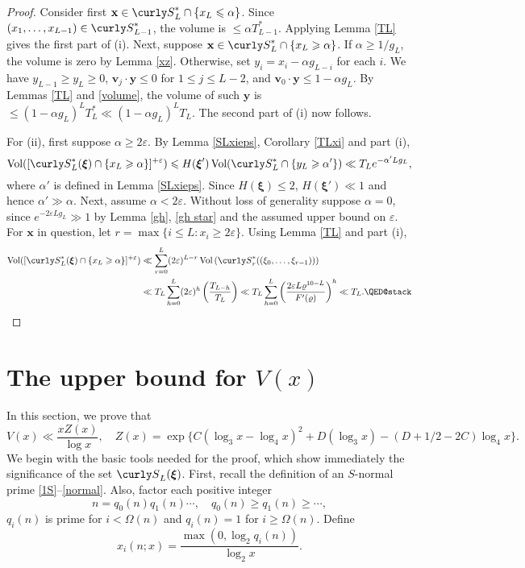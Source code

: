 \documentclass[11pt]{amsart}
\theoremstyle{remark}
\theoremstyle{plain}
\numberwithin{equation}{section}
\newcommand{\be}{\begin{equation}}
\newcommand{\ee}{\end{equation}}
\renewcommand{\a}{\ensuremath{\alpha}}
\newcommand{\eps}{\ensuremath{\varepsilon}}
\renewcommand{\(}{\left(}
\renewcommand{\)}{\right)}
\newcommand{\pfrac}[2]{\left(\frac{#1}{#2}\right)}
\newcommand{\fancyS}{{\curly S}}
\renewcommand{\le}{\leqslant}
\renewcommand{\ge}{\geqslant}
\renewcommand{\rho}{\varrho}
\newcommand{\om}{\Omega}
\newcommand{\bxi}{\boldsymbol\xi}
\newcommand{\vxi}{\bxi}
\newcommand{\vx}{\mathbf{x}}
\newcommand{\vy}{\mathbf{y}}
\DeclareMathOperator{\vvol}{Vol}
\newcommand{\vv}{\mathbf{v}}
\begin{document}
\begin{proof}
Consider first $\vx\in \fancyS_L^*\cap\{x_L\le\a\}$.  Since
 $(x_1, \ldots, x_{L-1}) \in \fancyS_{L-1}^*$, 
the volume  is $\le \a T_{L-1}^*$.
Applying Lemma \ref{TL} gives the first part of (i).
Next, suppose $\vx\in\fancyS_L^*\cap\{x_L\ge\a\}$.
If $\a\ge 1/g_L$, the volume is zero by Lemma \ref{xz}.  Otherwise, set
$y_i = x_i - \a g_{L-i}$ for each $i$.
We have $y_{L-1}\ge y_L\ge 0$, $\vv_j\cdot \vy \le 0$
for $1\le j\le L-2$, and $\vv_0 \cdot \vy \le 1 - \a g_L$.
By Lemmas \ref{TL} and \ref{volume}, the volume of such $\vy$ is
$\le (1-\a g_L)^L T_L^* \ll (1-\a g_L)^L T_L$. 
 The second part of (i) now follows.

For (ii), first suppose $\a \ge 2\eps$.  By Lemma \ref{SLxieps}, Corollary 
\ref{TLxi} and part (i),
\[
 \vvol([\fancyS_L^*(\bxi) \cap \{x_L\ge \a\}]^{+\eps}) \le H(\bxi') \vvol(\fancyS_L^*
\cap \{y_L \ge \a'\}) \ll T_L e^{-\a'Lg_L},
\]
where $\a'$ is defined  in Lemma \ref{SLxieps}.
Since $H(\bxi)\le 2$, $H(\bxi')\ll 1$ and hence $\a' \gg \a$.  Next, assume $\a < 2\eps$.
Without loss of generality suppose $\a=0$, since $e^{-2\eps Lg_L} \gg 1$ by Lemma
\ref{gh}, \eqref{gh star} and the assumed upper bound on $\eps$.  For $\vx$ in question, let
$r=\max\{i\le L: x_i \ge 2\eps\}$.  Using Lemma \ref{TL} and part (i),
\begin{align*}
 \vvol([\fancyS_L^*(\bxi) \cap \{x_L\ge \a\}]^{+\eps}) &\ll \sum_{r=0}^L
(2\eps)^{L-r} \vvol\( \fancyS_{r}^*((\xi_0,\ldots,\xi_{r-1})) \) \\
&\ll T_L \sum_{h=0}^L (2\eps)^h \pfrac{T_{L-h}}{T_L} 
\ll T_L  \sum_{h=0}^L \pfrac{2\eps L \rho^{10-L}}{F'(\rho)}^h \ll T_L.
\qedhere
\end{align*}
\end{proof}
%
%
%
\section{The upper bound for $V(x)$}
%
%
%


In this section, we prove that
\be\label{V upper}
V(x) \ll \frac{xZ(x)}{\log x}, \quad Z(x)= \exp\{ C(\log_3 x - \log_4 x)^2
 + D(\log_3 x) - (D+1/2-2C)\log_4 x\}. 
\ee
We begin with the basic tools needed for the proof, which show immediately
the significance of the set $\fancyS_L(\vxi)$.  First, recall the definition
of an $S$-normal prime \eqref{1S}--\eqref{normal}.  Also, factor each positive
integer 
\[ 
n=q_0(n)q_1(n)\cdots, \quad q_0(n)\ge q_1(n) \ge \cdots,
\]
$q_i(n)$ is prime for $i<\om(n)$ and $q_i(n)=1$ for $i \ge \om(n)$.  Define
\be\label{xinx}
x_i(n;x) = \frac{\max(0,\log_2 q_i(n))}{\log_2 x}.
\ee
\end{document}
